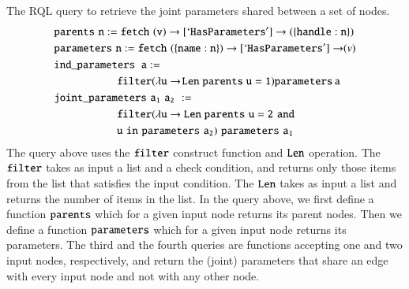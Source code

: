 \begin{example}
\label{ex:joint}
The RQL query to retrieve the joint parameters shared between a set of nodes.
\vskip -0.13in
{\small
\begin{align}
&{\tt {parents} \,\, n := fetch \,\, (v)\rightarrow [`HasParameters']\rightarrow  (\{handle:n\}) }\nonumber \\
& {\tt {parameters} \,\, n :=  fetch \,\, (\{name:n\})\rightarrow [`HasParameters']\rightarrow }  (v)  \nonumber  \\
& {\tt {ind\_parameters}\;\; a := }  \cr
&{\tt \hspace*{2cm} filter (\lambda u \rightarrow\! {Len \; parents}\; u = 1)     {parameters}\, a \nonumber } \\
& {\tt {joint\_parameters} \,\, a_1 \,\, a_2\,\, := } \cr
& {\tt \hspace*{2cm} filter (\lambda u \rightarrow {Len\; parents}\,\, u = 2\,\, and } \cr
& {\tt \hspace*{2cm}  u \,\, in \,\, {parameters}\,\, a_2)    \,\,{parameters}\,\, a_1 \nonumber}
\end{align}
}\vskip -0.01in
The query above uses the ${\tt filter}$ construct function and ${\tt Len}$ operation. The ${\tt filter}$ takes as input a list and a check condition, and returns only those items from the list that satisfies the input condition. The ${\tt Len}$ takes as input a list and returns the number of items in the list.
In the query above, we first define a function ${\tt parents}$ which for a given input node returns its parent nodes. Then we define a function ${\tt parameters}$ which for a given input node returns its parameters. The third and the fourth queries are functions accepting one and two input nodes, respectively, and return the (joint) parameters that share an edge with every input node and not with any other node.
\end{example}
